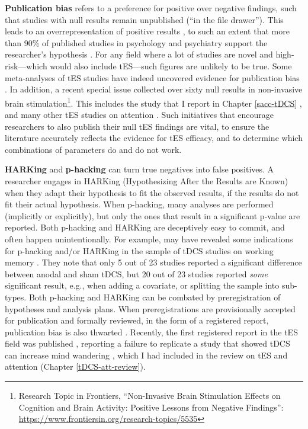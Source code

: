 \documentclass[11pt,]{memoir}
\let\rmarkdownfootnote\footnote%
\def\footnote{\protect\rmarkdownfootnote}
\begin{document}
\textbf{Publication bias} \autocite{Rosenthal1979} refers to a preference for positive over negative findings, such that studies with null results remain unpublished (``in the file drawer''). This leads to an overrepresentation of positive results \autocite{Franco2014}, to such an extent that more than 90\% of published studies in psychology and psychiatry support the researcher's hypothesis \autocite{Fanelli2012}. For any field where a lot of studies are novel and high-risk---which would also include tES---such figures are unlikely to be true. Some meta-analyses of tES studies have indeed uncovered evidence for publication bias \autocite{Mancuso2016}. In addition, a recent special issue collected over sixty null results in non-invasive brain stimulation\footnote{Research Topic in Frontiers, ``Non-Invasive Brain Stimulation Effects on Cognition and Brain Activity: Positive Lessons from Negative Findings'': \url{https://www.frontiersin.org/research-topics/5535}}. This includes the study that I report in Chapter \ref{sacc-tDCS} \autocite{Reteig2018b}, and many other tES studies on attention \autocites{Jacoby2018}{Learmonth2017}{Lanina2018}{VanSchouwenburg2018}{Sheldon2018}{Tseng2018}{Veniero2017}. Such initiatives that encourage researchers to also publish their null tES findings are vital, to ensure the literature accurately reflects the evidence for tES efficacy, and to determine which combinations of parameters do and do not work.

\textbf{HARKing} \autocite{Kerr1998} and \textbf{p-hacking} \autocites{Simmons2011}{Simonsohn2014} can turn true negatives into false positives. A researcher engages in HARKing (Hypothesizing After the Results are Known) when they adapt their hypothesis to fit the observed results, if the results do not fit their actual hypothesis. When p-hacking, many analyses are performed (implicitly or explicitly), but only the ones that result in a significant p-value are reported. Both p-hacking and HARKing are deceptively easy to commit, and often happen unintentionally. For example, \textcite{Medina2017} may have revealed some indications for p-hacking and/or HARKing in the sample of tDCS studies on working memory \autocite{Mancuso2016}. They note that only 5 out of 23 studies reported a significant difference between anodal and sham tDCS, but 20 out of 23 studies reported \emph{some} significant result, e.g., when adding a covariate, or splitting the sample into sub-types. Both p-hacking and HARKing can be combated by preregistration \autocite{Nosek2018} of hypotheses and analysis plans. When preregistrations are provisionally accepted for publication and formally reviewed, in the form of a registered report, publication bias is also thwarted \autocite{Chambers2014}. Recently, the first registered report in the tES field was published \autocite{Boayue2019}, reporting a failure to replicate a study that showed tDCS can increase mind wandering \autocite{Axelrod2015}, which I had included in the review on tES and attention (Chapter \ref{tDCS-att-review}).
\end{document}
